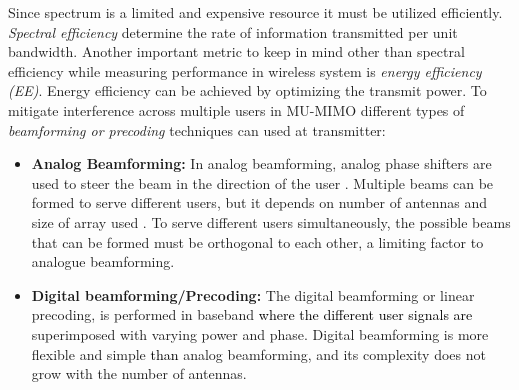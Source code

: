 Since spectrum is a limited and expensive resource it must be utilized efficiently. \textit{Spectral efficiency} determine the rate of information transmitted per unit bandwidth. Another important metric to keep in mind other than spectral efficiency  while measuring performance in wireless system is \textit{energy efficiency (EE)}. Energy efficiency can be achieved by optimizing the transmit power.
To mitigate interference across multiple users in MU-MIMO different types of \textit{beamforming or precoding} techniques can used at transmitter: 
\begin{itemize}
    \item \textbf{Analog Beamforming:} In analog beamforming, analog phase shifters are used to steer the beam in the direction of the user \cite{bjornson_book}. Multiple beams can be formed to serve different users, but it depends on number of antennas and size of array used \cite{thesis_xiang}. To serve different users simultaneously, the possible beams that can be formed must be orthogonal to each other, a limiting factor to analogue beamforming.
    \item \textbf{Digital beamforming/Precoding:} The digital beamforming or linear precoding, is performed in baseband \textcolor{black}{ where the different user signals are }superimposed with varying power and phase. Digital beamforming is more flexible and simple \textcolor{black}{than} analog beamforming, and its complexity does not grow with the number of antennas.
\end{itemize}

